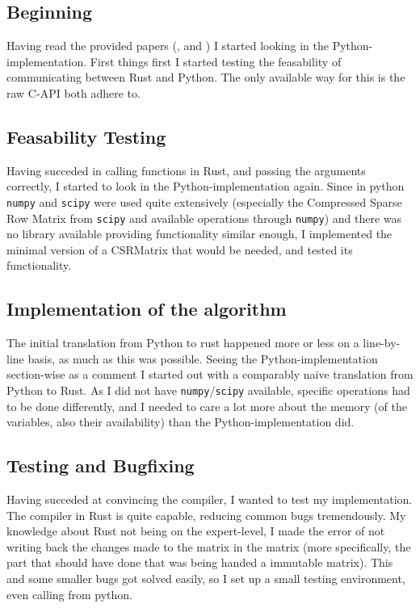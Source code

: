 \subsection{Beginning}

Having read the provided papers (\cite{imakaev2012iterative},
\cite{lieberman2009comprehensive} and \cite{wingett2015hicup}) I started
looking in the Python-implementation. First things first I started testing the
feasability of communicating between Rust and Python. The only available way
for this is the raw C-API both adhere to.


\subsection{Feasability Testing}

Having succeded in calling functions in Rust, and passing the arguments
correctly, I started to look in the Python-implementation again. Since in
python \verb|numpy| and \verb|scipy| were used quite extensively (especially
the Compressed Sparse Row Matrix from \verb|scipy| and available operations
through \verb|numpy|) and there was no library available providing
functionality similar enough, I implemented the minimal version of a CSRMatrix
that would be needed, and tested its functionality.


\subsection{Implementation of the algorithm}

The initial translation from Python to rust happened more or less on a
line-by-line basis, as much as this was possible. Seeing the
Python-implementation section-wise as a comment I started out with a comparably
naive translation from Python to Rust. As I did not have
\verb|numpy|/\verb|scipy| available, specific operations had to be done
differently, and I needed to care a lot more about the memory (of the
variables, also their availability) than the Python-implementation did.


\subsection{Testing and Bugfixing}

Having succeded at convincing the compiler, I wanted to test my implementation.
The compiler in Rust is quite capable, reducing common bugs tremendously.
My knowledge about Rust not being on the expert-level, I made the error of not
writing back the changes made to the matrix in the matrix (more specifically,
the part that should have done that was being handed a immutable matrix). This
and some smaller bugs got solved easily, so I set up a small testing
environment, even calling from python.


